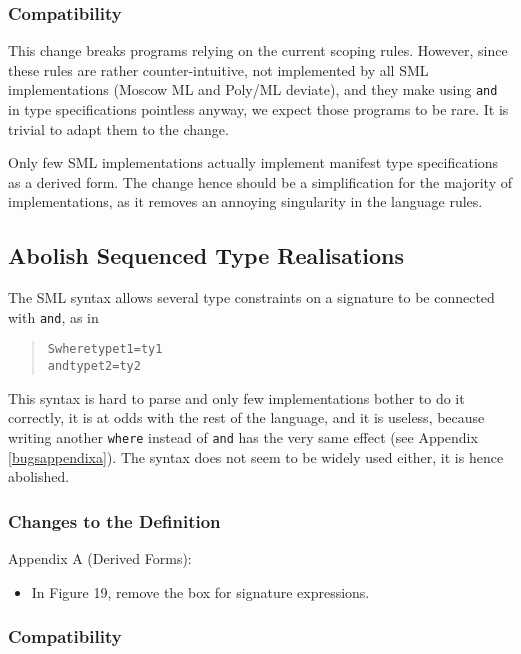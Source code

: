 \documentclass[twoside,titlepage]{article}
\begin{document}
\begin{appendix}
\subsubsection*{Compatibility}

This change breaks programs relying on the current scoping rules. However, since these rules are rather counter-intuitive, not implemented by all SML implementations (Moscow ML and Poly/ML deviate), and they make using {\tt and} in type specifications pointless anyway, we expect those programs to be rare. It is trivial to adapt them to the change.

Only few SML implementations actually implement manifest type specifications as a derived form. The change hence should be a simplification for the majority of implementations, as it removes an annoying singularity in the language rules.


\subsection{Abolish Sequenced Type Realisations}
\label{ext-realisation}

The SML syntax allows several type constraints on a signature to be connected with {\tt and}, as in
\begin{quote}
\begin{alltt}
S where type t1 = ty1
    and type t2 = ty2
\end{alltt}
\end{quote}
This syntax is hard to parse and only few implementations bother to do it correctly, it is at odds with the rest of the language, and it is useless, because writing another {\tt where} instead of {\tt and} has the very same effect (see Appendix \ref{bugsappendixa}). The syntax does not seem to be widely used either, it is hence abolished.

\subsubsection*{Changes to the Definition}

Appendix A (Derived Forms):
\begin{itemize}
\item In Figure 19, remove the box for signature expressions.
\end{itemize}

\subsubsection*{Compatibility}


\end{appendix}
\end{document}
